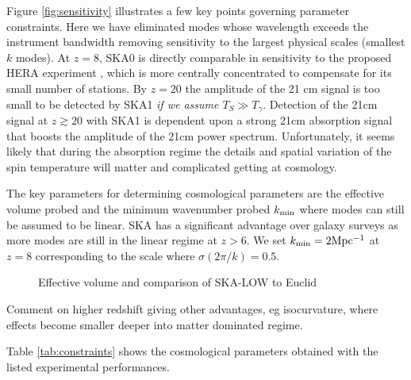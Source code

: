 \documentclass{PoS}
\begin{document}
Figure \ref{fig:sensitivity} illustrates a few key points governing parameter constraints. Here we have eliminated modes whose wavelength exceeds the instrument bandwidth removing sensitivity to the largest physical scales (smallest $k$ modes). At $z=8$, SKA0 is directly comparable in sensitivity to the proposed HERA experiment \cite{2014ApJ...782...66P}, which is more centrally concentrated to compensate for its small number of stations. By $z=20$ the amplitude of the 21 cm signal is too small to be detected by SKA1 {\em if we assume $T_S\gg T_\gamma$}. Detection of the 21cm signal at $z\gtrsim20$ with SKA1 is dependent upon a strong 21cm absorption signal that boosts the amplitude of the 21cm power spectrum. Unfortunately, it seems likely that during the absorption regime the details and spatial variation of the spin temperature will matter and complicated getting at cosmology.

The key parameters for determining cosmological parameters are the effective volume probed and the minimum wavenumber probed $k_{\rm min}$ where modes can still be assumed to be linear. SKA has a significant advantage over galaxy surveys as more modes are still in the linear regime at $z>6$. We set $k_{\rm min}=2{\rm Mpc^{-1}}$ at $z=8$ corresponding to the scale where $\sigma(2\pi/k)=0.5$.

\begin{figure}[htbp]
\begin{center}

\caption{Effective volume and comparison of SKA-LOW to Euclid}
\label{fig:effectivevolume}
\end{center}
\end{figure}

Comment on higher redshift giving other advantages, eg isocurvature, where effects become smaller deeper into matter dominated regime.

Table \ref{tab:constraints} shows the cosmological parameters obtained with the listed experimental performances.
\end{document}
